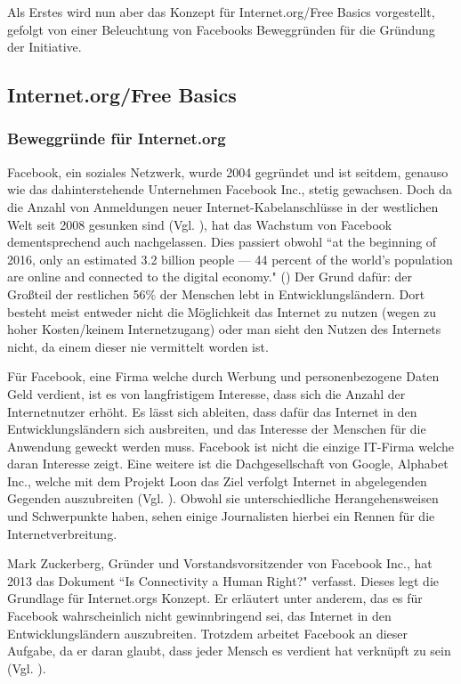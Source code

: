 \documentclass{article}
\begin{document}
Als Erstes wird nun aber das Konzept für Internet.org/Free Basics vorgestellt, gefolgt von einer Beleuchtung von Facebooks Beweggründen für die Gründung der Initiative.

\subsection{Internet.org/Free Basics}

\subsubsection{Beweggründe für Internet.org}
Facebook, ein soziales Netzwerk, wurde 2004 gegründet und ist seitdem, genauso wie das dahinterstehende Unternehmen Facebook Inc., stetig gewachsen. 
Doch da die Anzahl von Anmeldungen neuer Internet-Kabelanschlüsse in der westlichen Welt seit 2008 gesunken sind
(Vgl. \cite{ICTslowingDown}), hat das Wachstum von Facebook dementsprechend auch nachgelassen.
Dies passiert obwohl ``at the beginning of 2016, only an estimated 3.2 billion people — 44 percent of the world’s population are online and connected to the digital economy." (\cite[7]{connectWorld})
Der Grund dafür: der Großteil der restlichen 56\% der Menschen lebt in Entwicklungsländern. Dort besteht meist entweder nicht die Möglichkeit das Internet zu nutzen (wegen zu hoher Kosten/keinem Internetzugang) oder man sieht den Nutzen des Internets nicht, da einem dieser nie vermittelt worden ist.

\medskip

Für Facebook, eine Firma welche durch Werbung und personenbezogene Daten Geld verdient, ist es von langfristigem Interesse, dass sich die Anzahl der Internetnutzer erhöht.
Es lässt sich ableiten, dass dafür das Internet in den Entwicklungsländern sich ausbreiten, und das Interesse der Menschen für die Anwendung geweckt werden muss.
Facebook ist nicht die einzige IT-Firma welche daran Interesse  zeigt.
Eine weitere ist die Dachgesellschaft von Google, Alphabet Inc., welche mit dem Projekt Loon das Ziel verfolgt Internet in abgelegenden Gegenden auszubreiten (Vgl. \cite{projectLoon}). %
Obwohl sie unterschiedliche Herangehensweisen und Schwerpunkte haben, sehen einige Journalisten hierbei ein Rennen für die Internetverbreitung. 

\medskip

Mark Zuckerberg, Gründer und Vorstandsvorsitzender von Facebook Inc., hat 2013 das Dokument ``Is Connectivity a Human Right?" verfasst.
Dieses legt die Grundlage für Internet.orgs Konzept.
Er erläutert unter anderem, das es für Facebook wahrscheinlich nicht gewinnbringend sei, das Internet in den Entwicklungsländern auszubreiten.
Trotzdem arbeitet Facebook an dieser Aufgabe, da er daran glaubt, dass jeder Mensch es verdient hat verknüpft zu sein (Vgl. \cite[1]{HumanRight}).
\end{document}
